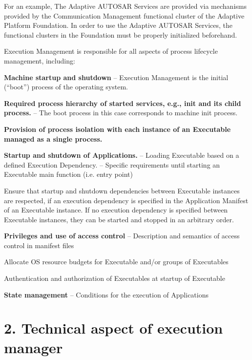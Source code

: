 For an example, The Adaptive A\+U\+T\+O\+S\+AR Services are provided via mechanisms provided by the Communication Management functional cluster of the Adaptive Platform Foundation. In order to use the Adaptive A\+U\+T\+O\+S\+AR Services, the functional clusters in the Foundation must be properly initialized beforehand.

Execution Management is responsible for all aspects of process lifecycle management, including\+:


\begin{DoxyItemize}
\item {\bfseries Machine startup and shutdown} – Execution Management is the initial (“boot”) process of the operating system.
\item {\bfseries Required process hierarchy of started services, e.\+g., init and its child process.} – The boot process in this case corresponds to machine init process.
\item {\bfseries Provision of process isolation with each instance of an Executable managed as a single process.}
\item {\bfseries Startup and shutdown of Applications.} – Loading Executable based on a defined Execution Dependency. – Specific requirements until starting an Executable main function (i.\+e. entry point)
\begin{DoxyItemize}
\item Ensure that startup and shutdown dependencies between Executable instances are respected, if an execution dependency is specified in the Application Manifest of an Executable instance. If no execution dependency is specified between Executable instances, they can be started and stopped in an arbitrary order.
\end{DoxyItemize}
\item {\bfseries Privileges and use of access control} – Description and semantics of access control in manifest files
\begin{DoxyItemize}
\item Allocate OS resource budgets for Executable and/or groups of Executables
\item Authentication and authorization of Executables at startup of Executable
\end{DoxyItemize}
\item {\bfseries State management} – Conditions for the execution of Applications
\end{DoxyItemize}

\section*{2. {\bfseries Technical aspect of execution manager}}


